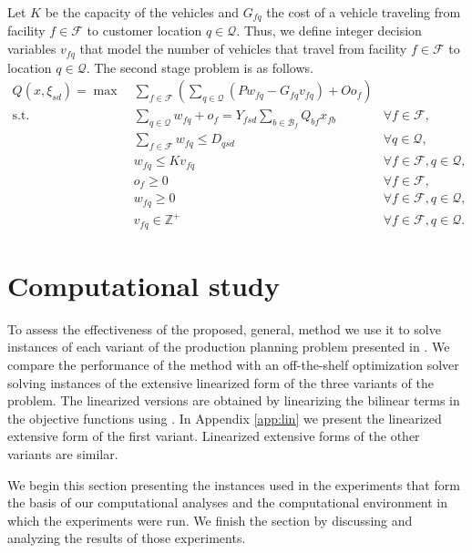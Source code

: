 \documentclass[12pt]{article}
\theoremstyle{thmstylethree}%
\newcommand{\mtc}[1] {\mathcal{#1}}
\begin{document}
Let $K$ be the capacity of the vehicles and $G_{fq}$ the cost of a vehicle traveling from facility $f \in \mtc{F}$ to customer location $q \in \mtc{Q}$. Thus, we define integer decision variables $v_{fq}$ that model the number of vehicles that travel from facility $f \in \mtc{F}$ to location $q \in \mtc{Q}$. The second stage problem is as follows.
\begin{subequations}\label{eq:ppp3:sp}
\begin{flalign}
Q(x,\xi_{sd}) = \max~&\sum_{f\in\mathcal{F}}\left(\sum_{q\in\mtc{Q}}(Pw_{fq} - G_{fq}v_{fq}) +Oo_{f}\right) & \\
\label{eq:ppp3:sp:c0}\text{s.t.~} &\sum_{q\in\mtc{Q}}w_{fq}+o_{f}= Y_{fsd}\sum_{b \in \mtc{B}_{f}}Q_{bf}x_{fb} & \forall f\in\mathcal{F}, \\
\label{eq:ppp3:sp:c6}  &\sum_{f\in\mathcal{F}}w_{fq}\leq D_{qsd}&\forall  q\in\mtc{Q},\\
\label{eq:ppp3:sp:c7} & w_{fq} \leq Kv_{fq} & \forall f \in \mtc{F}, q \in \mtc{Q}, \\ 
\label{eq:ppp3:sp:r1} &  o_{f} \geq 0 & \forall f\in\mathcal{F}, \\
\label{eq:ppp3:sp:r2} & w_{fq} \geq 0 & \forall f \in \mathcal{F}, q \in \mathcal{Q},\\
\label{eq:ppp3:sp:r3} & v_{fq} \in \mathbb{Z}^+ & \forall f \in \mathcal{F}, q \in \mathcal{Q}.
\end{flalign}
\end{subequations}


\section{Computational study}
\label{sec:comp_study}

To assess the effectiveness of the proposed, general, method we use it to solve instances of each variant of the production planning problem presented in . We compare the performance of the method with an off-the-shelf optimization solver solving instances of the extensive linearized form of the three variants of the problem. The linearized versions are obtained by linearizing the bilinear terms in the objective functions using \cite{Mcc76,AlkF83}. In Appendix \ref{app:lin} we present the linearized extensive form of the first variant. Linearized extensive forms of the other variants are similar.  


We begin this section presenting the instances used in the experiments that form the basis of our computational analyses and the computational environment in which the experiments were run. We finish the section by discussing and analyzing the results of those experiments.
\end{document}

